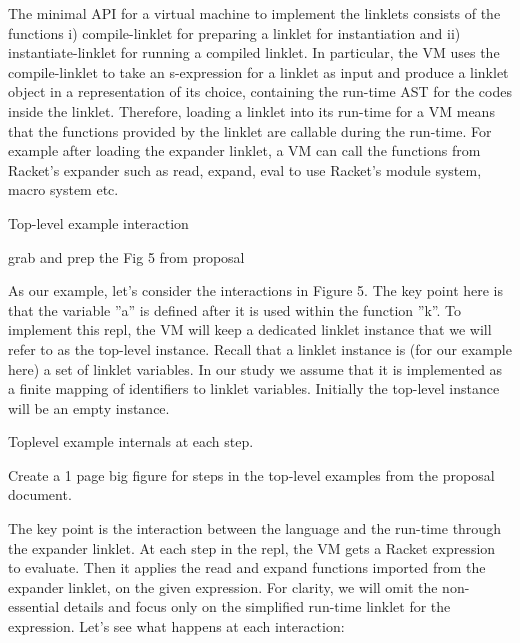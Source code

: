 		\begin{paragraph-here}
			The minimal API for a virtual machine to implement the linklets consists of the functions i) compile-linklet for preparing a linklet for instantiation and ii) instantiate-linklet for running a compiled linklet. In particular, the VM uses the compile-linklet to take an s-expression for a linklet as input and produce a linklet object in a representation of its choice, containing the run-time AST for the codes inside the linklet. Therefore, loading a linklet into its run-time for a VM means that the functions provided by the linklet are callable during the run-time. For example after loading the expander linklet, a VM can call the functions from Racket’s expander such as read, expand, eval to use Racket’s module system, macro system etc.
		\end{paragraph-here}

		\begin{figure-here}
			Top-level example interaction

			\begin{todo}
				grab and prep the Fig 5 from proposal
			\end{todo}
		\end{figure-here}

		\begin{paragraph-here}
			As our example, let’s consider the interactions in Figure 5. The key point here is that the variable ”a” is defined after it is used within the function ”k”. To implement this repl, the VM will keep a dedicated linklet instance that we will refer to as the top-level instance. Recall that a linklet instance is (for our example here) a set of linklet variables. In our study we assume that it is implemented as a finite mapping of identifiers to linklet variables. Initially the top-level instance will be an empty instance.
		\end{paragraph-here}

		\begin{figure-here}
			Toplevel example internals at each step.

			\begin{todo}
				Create a 1 page big figure for steps in the top-level examples from the proposal document.
			\end{todo}
		\end{figure-here}

		\begin{paragraph-here}
			The key point is the interaction between the language and the run-time through the expander linklet. At each step in the repl, the VM gets a Racket expression to evaluate. Then it applies the read and expand functions imported from the expander linklet, on the given expression. For clarity, we will omit the non-essential details and focus only on the simplified run-time linklet for the expression. Let’s see what happens at each interaction:
		\end{paragraph-here}



